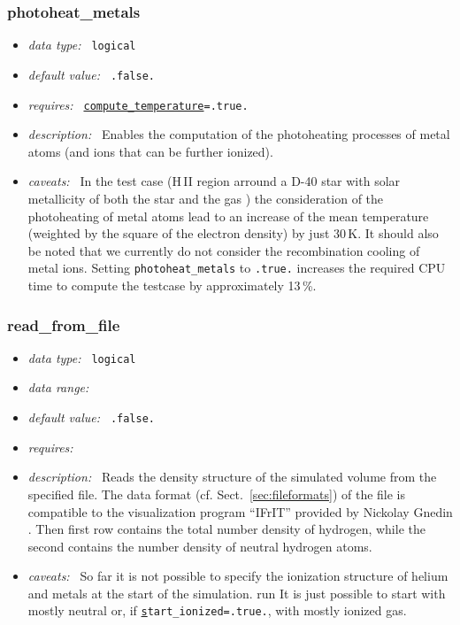 \documentclass[a4paper,10pt]{article}
\begin{document}
\subsubsection{photoheat\_metals}
\label{opt:photoheatmetals}
\begin{itemize}
 \item \textit{data type:~} \texttt{logical}
 \item \textit{default value:~} \texttt{.false.}
 \item \textit{requires:~} \texttt{\hyperref[opt:computetemperature]{compute\_temperature}=.true.}
 \item \textit{description:~} Enables the computation of the photoheating 
  processes of metal atoms (and ions that can be further ionized).  
 \item \textit{caveats:~} In the test case (H\,II region arround a D-40 star with 
 solar metallicity of both the star and the gas ) the consideration of the 
 photoheating of metal atoms lead  to an increase of the mean temperature 
 (weighted by the square of the  electron density) by just 30\,K. It should 
 also be noted that we currently  do not consider the recombination cooling of 
 metal ions. Setting \texttt{photoheat\_metals} to \texttt{.true.} increases the 
 required  CPU time to compute the testcase by approximately 13\,\%.
\end{itemize}


\subsubsection{read\_from\_file}
\label{opt:readfromfile}
\begin{itemize}
 \item \textit{data type:~} \texttt{logical}
 \item \textit{data range:~}
 \item \textit{default value:~} \texttt{.false.}
 \item \textit{requires:~}
 \item \textit{description:~} Reads the density structure of the simulated  
  volume from the specified file. The  data format (cf.
  Sect.~\ref{sec:fileformats}) of the file is compatible to the visualization 
  program ``IFrIT'' provided by Nickolay Gnedin . Then first row contains the 
  total number density of hydrogen, while the second contains the number 
  density of neutral hydrogen atoms. 
 \item \textit{caveats:~} So far it is not possible to specify the ionization  
  structure of helium and metals at the start of the simulation. run It is just 
  possible to start with mostly neutral or, if 
  \texttt{\hyperref[opt:startionized]start\_ionized=.true.}, with mostly 
  ionized gas.
 


\end{itemize}
\end{document}
